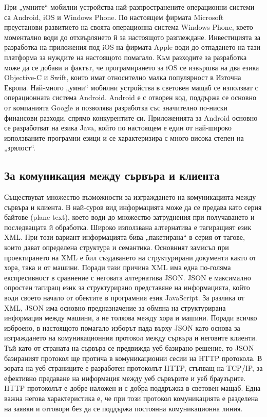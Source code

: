 При „умните“ мобилни устройства най-разпространените операционни системи са Android, iOS и Windows Phone. По настоящем фирмата Microsoft преустанови развитието на своята операционна система Windows Phone, което моментално води до отхвърлянето й за настоящото разглеждане. Инвестицията за разработка на приложения под iOS на фирмата Apple води до отпадането на тази платформа за нуждите на настоящото помагало. Към разходите за разработка може да се добави и фактът, че програмирането за iOS се извършва на два езика Objective-C и Swift, които имат относително малка популярност в Източна Европа. Най-много „умни“ мобилни устройства в световен мащаб се използват с операционната система Android. Android е с отворен код, поддържа се основно от компанията Google и позволява разработка със значително по-ниски финансови разходи, спрямо конкурентите си. Приложенията за Android основно се разработват на езика Java, който по настоящем е един от най-широко използваните програмни езици и се характеризира с много висока степен на „зрялост“. 

\subsection{За комуникация между сървъра и клиента}

Съществуват множество възможности за изграждането на комуникацията между сървъра и клиента. В най-суров вид информацията може да се предава като серия байтове (plane text), което води до множество затруднения при получаването и последващата й обработка. Широко използвана алтернатива е тагиращият език XML. При този вариант информацията бива „пакетирана“ в серия от тагове, които дават определена структура и семантика. Основният замисъл при проектирането на XML е бил създаването на структурирани документи както от хора, така и от машини. Поради тази причина XML има една по-голяма експресивност в сравнение с неговата алтернатива JSON. JSON е максимално опростен тагиращ език за структурирано представяне на информацията, който води своето начало от обектите в програмния език JavaScript. За разлика от XML, JSON има основно предназначение за обмяна на структурирана информация между машини, а не толкова между хора и машини. Поради всичко изброено, в настоящото помагало изборът пада върху JSON като основа за изграждането на комуникационния протокол между сървъра и неговите клиенти. Тъй като от страната на сървъра се предвижда уеб базирано решение, то JSON базираният протокол ще протича в комуникационни сесии на HTTP протокола. В зората на уеб страниците е разработен протоколът HTTP, стъпващ на TCP/IP, за ефективно предаване на информация между уеб сървърите и уеб браузърите. HTTP протоколът е добре наложен и с добра поддръжка в световен мащаб. Една важна негова характеристика е, че при този протокол комуникацията е разделена на заявки и отговори без да се поддържа постоянна комуникационна линия. 

